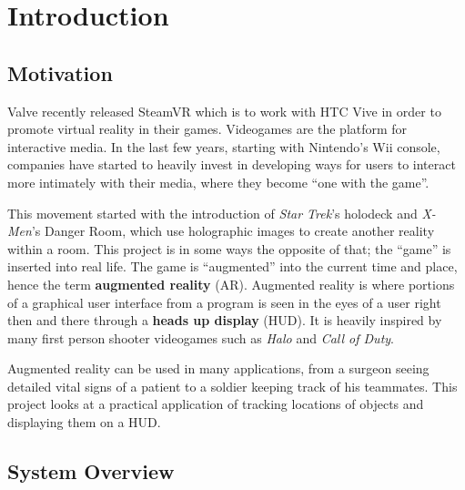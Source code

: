 
\chapter{Introduction} %

\label{Introduction} %


\section{Motivation}

Valve recently released SteamVR which is to work with HTC Vive in order to promote virtual reality in their games. Videogames are the platform for interactive media. In the last few years, starting with Nintendo’s Wii console, companies have started to heavily invest in developing ways for users to interact more intimately with their media, where they become ``one with the game”. 

This movement started with the introduction of \emph{Star Trek}’s holodeck and \emph{X-Men}’s Danger Room, which use holographic images to create another reality within a room. This project is in some ways the opposite of that; the ``game'' is inserted into real life. The game is “augmented” into the current time and place, hence the term \textbf{augmented reality} (AR). Augmented reality is where portions of a graphical user interface from a program is seen in the eyes of a user right then and there through a \textbf{heads up display} (HUD). It is heavily inspired by many first person shooter videogames such as \emph{Halo} and \emph{Call of Duty}. 

Augmented reality can be used in many applications, from a surgeon seeing detailed vital signs of a patient to a soldier keeping track of his teammates. This project looks at a practical application of tracking locations of objects and displaying them on a HUD.

\section{System Overview}

